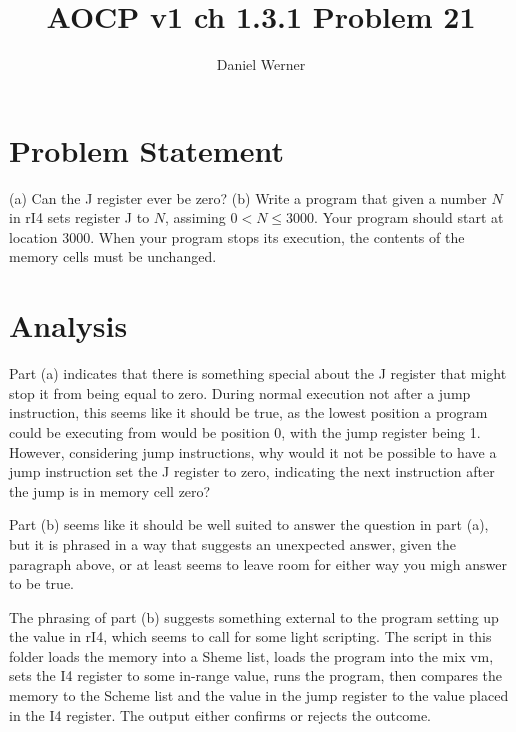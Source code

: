 \documentclass{article}
\title{AOCP v1 ch 1.3.1 Problem 21}
\author{Daniel Werner}
\begin{document}
\maketitle

\section*{
    Problem Statement
}

(a) Can the J register ever be zero? (b) Write a program that given
a number $N$ in rI4 sets register J to $N$, assiming
$0 < N \le 3000$.  Your program should start at location 3000.
When your program stops its execution, the contents of the memory
cells must be unchanged.

\section*{
    Analysis
}

Part (a) indicates that there is something special about the J register
that might stop it from being equal to zero.  During normal execution not
after a jump instruction, this seems like it should be true, as the
lowest position a program could be executing from would be position 0,
with the jump register being 1.  However, considering jump instructions,
why would it not be possible to have a jump instruction set the J register
to zero, indicating the next instruction after the jump is in memory cell
zero?

\par

Part (b) seems like it should be well suited to answer the question in part
(a), but it is phrased in a way that suggests an unexpected answer, given the
paragraph above, or at least seems to leave room for either way you migh
answer to be true.

\par

The phrasing of part (b) suggests something external to the program setting
up the value in rI4, which seems to call for some light scripting. The script
in this folder loads the memory into a Sheme list, loads the program into the
mix vm, sets the I4 register to some in-range value, runs the program, then
compares the memory to the Scheme list and the value in the jump register to
the value placed in the I4 register.  The output either confirms or rejects
the outcome.

\par
\end{document}
